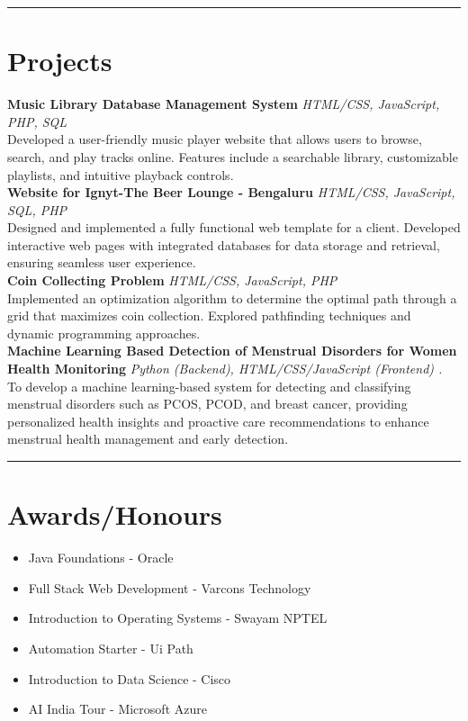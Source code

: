 \documentclass[a4paper,10pt]{article}
\begin{document}
\vspace{1em}
\noindent\rule{16cm}{0.4pt}

\section*{Projects} 
\noindent\textbf{Music Library Database Management System} \hfill \textit{HTML/CSS, JavaScript, PHP, SQL} \\
Developed a user-friendly music player website that allows users to browse, search, and play tracks online. Features include a searchable library, customizable playlists, and intuitive playback controls.\\

\noindent\textbf{Website for Ignyt-The Beer Lounge - Bengaluru} \hfill \textit{HTML/CSS, JavaScript, SQL, PHP} \\
Designed and implemented a fully functional web template for a client. Developed interactive web pages with integrated databases for data storage and retrieval, ensuring seamless user experience.\\

\noindent\textbf{Coin Collecting Problem} \hfill \textit{HTML/CSS, JavaScript, PHP} \\
Implemented an optimization algorithm to determine the optimal path through a grid that maximizes coin collection. Explored pathfinding techniques and dynamic programming approaches.\\

\noindent\textbf{Machine Learning Based Detection of Menstrual Disorders for Women Health Monitoring} \hfill \textit{Python (Backend), HTML/CSS/JavaScript (Frontend) .} \\
To develop a machine learning-based system for detecting and classifying menstrual disorders 
such as PCOS, PCOD, and breast cancer, providing personalized health insights and proactive 
care recommendations to enhance menstrual health management and early detection.\\


\vspace{1em}
\noindent\rule{16cm}{0.4pt}

\section*{Awards/Honours}
\begin{itemize}[left=0pt, label=\textbullet, labelsep=1em]
    \item Java Foundations - Oracle
    \item Full Stack Web Development - Varcons Technology
    \item Introduction to Operating Systems - Swayam NPTEL
    \item Automation Starter - Ui Path
    \item Introduction to Data Science - Cisco
    \item AI India Tour - Microsoft Azure
\end{itemize}
\end{document}
